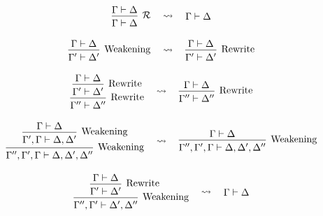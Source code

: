 \begin{figure}[H]
  \centering
  \begin{framed}
  \begin{gather*}
  \begin{prooftree}
  \hypo{\Gamma \vdash \Delta}
  \infer1[$\mathcal{R}$]{\Gamma \vdash \Delta}
  \end{prooftree}
  \quad\leadsto\quad
  \begin{prooftree}
  \hypo{\Gamma \vdash \Delta}
  \end{prooftree} \\[1em]
  \begin{prooftree}
  \hypo{\Gamma \vdash \Delta}
  \infer1[Weakening]{\Gamma' \vdash \Delta'}
  \end{prooftree}
  \quad\leadsto\quad
  \begin{prooftree}
  \hypo{\Gamma \vdash \Delta}
  \infer1[Rewrite]{\Gamma' \vdash \Delta'}
  \end{prooftree} \\[1em]
  \begin{prooftree}
  \hypo{\Gamma \vdash \Delta}
  \infer1[Rewrite]{\Gamma' \vdash \Delta'}
  \infer1[Rewrite]{\Gamma'' \vdash \Delta''}
  \end{prooftree}
  \quad\leadsto\quad
  \begin{prooftree}
  \hypo{\Gamma \vdash \Delta}
  \infer1[Rewrite]{\Gamma'' \vdash \Delta''}
  \end{prooftree} \\[1em]
  \begin{prooftree}
  \hypo{\Gamma \vdash \Delta}
  \infer1[Weakening]{\Gamma', \Gamma \vdash \Delta, \Delta'}
  \infer1[Weakening]{\Gamma'', \Gamma', \Gamma \vdash \Delta, \Delta', \Delta''}
  \end{prooftree}
  \quad\leadsto\quad
  \begin{prooftree}
  \hypo{\Gamma \vdash \Delta}
  \infer1[Weakening]{\Gamma'', \Gamma', \Gamma \vdash \Delta, \Delta', \Delta''}
  \end{prooftree} \\[1em]
  \begin{prooftree}
  \hypo{\Gamma \vdash \Delta}
  \infer1[Rewrite]{\Gamma' \vdash \Delta'}
  \infer1[Weakening]{\Gamma'', \Gamma' \vdash \Delta', \Delta''}
  \end{prooftree}
  \quad\leadsto\quad
  \begin{prooftree}
  \hypo{\Gamma \vdash \Delta}

\end{prooftree}
\end{gather*}
\end{framed}
\end{figure}
